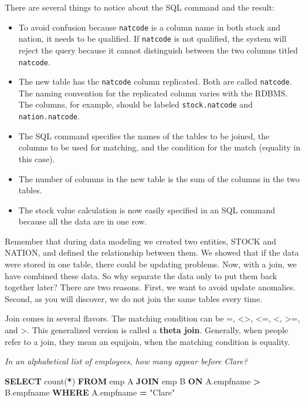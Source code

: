 \documentclass[
]{article}
\newenvironment{Shaded}{\begin{snugshade}}{\end{snugshade}}
\newcommand{\FunctionTok}[1]{\textcolor[rgb]{0.00,0.00,0.00}{#1}}
\newcommand{\KeywordTok}[1]{\textcolor[rgb]{0.13,0.29,0.53}{\textbf{#1}}}
\newcommand{\NormalTok}[1]{#1}
\newcommand{\OperatorTok}[1]{\textcolor[rgb]{0.81,0.36,0.00}{\textbf{#1}}}
\newcommand{\OtherTok}[1]{\textcolor[rgb]{0.56,0.35,0.01}{#1}}
\begin{document}
There are several things to notice about the SQL command and the result:

\begin{itemize}
\item
  To avoid confusion because \texttt{natcode} is a column name in both stock
  and nation, it needs to be qualified. If \texttt{natcode} is not qualified,
  the system will reject the query because it cannot distinguish
  between the two columns titled \texttt{natcode}.
\item
  The new table has the \texttt{natcode} column replicated. Both are called
  \texttt{natcode}. The naming convention for the replicated column varies
  with the RDBMS. The columns, for example, should be labeled
  \texttt{stock.natcode} and \texttt{nation.natcode}.
\item
  The SQL command specifies the names of the tables to be joined, the
  columns to be used for matching, and the condition for the match
  (equality in this case).
\item
  The number of columns in the new table is the sum of the columns in
  the two tables.
\item
  The stock value calculation is now easily specified in an SQL
  command because all the data are in one row.
\end{itemize}

Remember that during data modeling we created two entities, STOCK and
NATION, and defined the relationship between them. We showed that if the
data were stored in one table, there could be updating problems. Now,
with a join, we have combined these data. So why separate the data only
to put them back together later? There are two reasons. First, we want
to avoid update anomalies. Second, as you will discover, we do not join
the same tables every time.

Join comes in several flavors. The matching condition can be =, \textless\textgreater,
\textless=, \textless, \textgreater=, and \textgreater. This generalized version is called a \textbf{theta
join}. Generally, when people refer to a join, they mean an equijoin,
when the matching condition is equality.

\emph{In an alphabetical list of employees, how many appear before Clare?}

\begin{Shaded}
\begin{Highlighting}[]
\KeywordTok{SELECT} \FunctionTok{count}\NormalTok{(}\OperatorTok{*}\NormalTok{) }\KeywordTok{FROM}\NormalTok{ emp A }\KeywordTok{JOIN}\NormalTok{ emp B}
  \KeywordTok{ON}\NormalTok{ A.empfname }\OperatorTok{\textgreater{}}\NormalTok{ B.empfname}
  \KeywordTok{WHERE}\NormalTok{ A.empfname }\OperatorTok{=} \OtherTok{"Clare"}
\end{Highlighting}
\end{Shaded}
\end{document}
